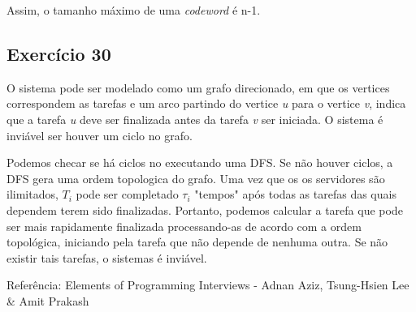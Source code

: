 Assim, o tamanho máximo de uma {\it codeword} é n-1.

\subsection{Exercício 30}\label{sec:exer30}

O sistema pode ser modelado como um grafo direcionado, em que os vertices correspondem
as tarefas e um arco partindo do vertice {\it u} para o vertice {\it v}, indica
que a tarefa {\it u} deve ser finalizada antes da tarefa {\it v} ser iniciada. O
sistema é inviável ser houver um ciclo no grafo.

Podemos checar se há ciclos no executando uma DFS. Se não houver ciclos, a DFS
gera uma ordem topologica do grafo. Uma vez que os os servidores são ilimitados,
$T_{i}$ pode ser completado $\tau_i$ "tempos" após todas as tarefas das quais
dependem terem sido finalizadas. Portanto, podemos calcular a tarefa que pode ser
mais rapidamente finalizada processando-as de acordo com a ordem topológica,
iniciando pela tarefa que não depende de nenhuma outra. Se não existir tais tarefas,
o sistemas é inviável.

Referência: Elements of Programming Interviews - Adnan Aziz, Tsung-Hsien Lee \& Amit Prakash
